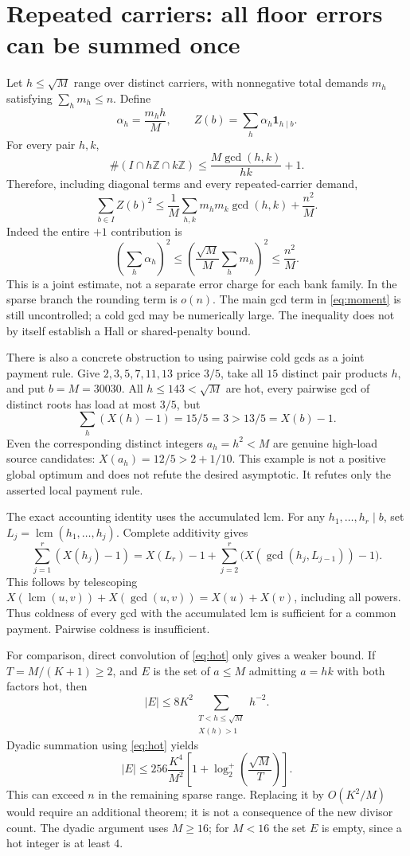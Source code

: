\documentclass[a4paper,11pt]{article}
\begin{document}
\section{Repeated carriers: all floor errors can be summed once}
Let $h\le\sqrt M$ range over distinct carriers, with nonnegative total demands $m_h$ satisfying $\sum_hm_h\le n$. Define
\[
 \alpha_h=\frac{m_hh}{M},\qquad
 Z(b)=\sum_h\alpha_h\mathbf1_{h\mid b}.
\]
For every pair $h,k$,
\[
 \#(I\cap h\mathbb Z\cap k\mathbb Z)
 \le\frac{M\gcd(h,k)}{hk}+1.
\]
Therefore, including diagonal terms and every repeated-carrier demand,
\begin{equation}\label{eq:moment}
 \boxed{\sum_{b\in I}Z(b)^2
 \le\frac1M\sum_{h,k}m_hm_k\gcd(h,k)+\frac{n^2}{M}.}
\end{equation}
Indeed the entire $+1$ contribution is
\[
 \left(\sum_h\alpha_h\right)^2
 \le\left(\frac{\sqrt M}{M}\sum_hm_h\right)^2
 \le\frac{n^2}{M}.
\]
This is a joint estimate, not a separate error charge for each bank family. In the sparse branch the rounding term is $o(n)$. The main gcd term in \eqref{eq:moment} is still uncontrolled; a cold gcd may be numerically large. The inequality does not by itself establish a Hall or shared-penalty bound.

There is also a concrete obstruction to using pairwise cold gcds as a joint payment rule. Give $2,3,5,7,11,13$ price $3/5$, take all $15$ distinct pair products $h$, and put $b=M=30030$. All $h\le143<\sqrt M$ are hot, every pairwise gcd of distinct roots has load at most $3/5$, but
\[
 \sum_h(X(h)-1)=15/5=3>13/5=X(b)-1.
\]
Even the corresponding distinct integers $a_h=h^2<M$ are genuine high-load source candidates: $X(a_h)=12/5>2+1/10$. This example is not a positive global optimum and does not refute the desired asymptotic. It refutes only the asserted local payment rule.

The exact accounting identity uses the accumulated lcm. For any $h_1,\ldots,h_r\mid b$, set $L_j=\operatorname{lcm}(h_1,\ldots,h_j)$. Complete additivity gives
\begin{equation}\label{eq:lcm}
 \boxed{\sum_{j=1}^r(X(h_j)-1)=X(L_r)-1+
 \sum_{j=2}^r\bigl(X(\gcd(h_j,L_{j-1}))-1\bigr).}
\end{equation}
This follows by telescoping $X(\operatorname{lcm}(u,v))+X(\gcd(u,v))=X(u)+X(v)$, including all powers. Thus coldness of every gcd with the accumulated lcm is sufficient for a common payment. Pairwise coldness is insufficient.

For comparison, direct convolution of \eqref{eq:hot} only gives a weaker bound. If $T=M/(K+1)\ge2$, and $E$ is the set of $a\le M$ admitting $a=hk$ with both factors hot, then
\[
 |E|\le8K^2\sum_{\substack{T<h\le\sqrt M\\X(h)>1}}h^{-2}.
\]
Dyadic summation using \eqref{eq:hot} yields
\begin{equation}\label{eq:twohot}
 |E|\le256\frac{K^4}{M^2}
 \left[1+\log_2^+\left(\frac{\sqrt M}{T}\right)\right].
\end{equation}
This can exceed $n$ in the remaining sparse range. Replacing it by $O(K^2/M)$ would require an additional theorem; it is not a consequence of the new divisor count.
The dyadic argument uses $M\ge16$; for $M<16$ the set $E$ is empty, since a hot integer is at least $4$.
\end{document}
